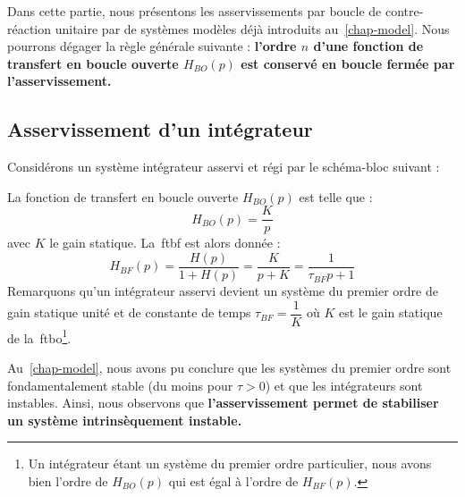 Dans cette partie, nous présentons les asservissements par boucle 
de contre-réaction unitaire par de systèmes modèles déjà introduits 
au~\cref{chap-model}. Nous pourrons dégager la règle générale suivante :
\textbf{l'ordre $n$ d'une fonction de transfert en boucle ouverte $H_{BO}(p)$
est conservé en boucle fermée par l'asservissement.}

\subsection{Asservissement d'un intégrateur}

Considérons un système intégrateur asservi et régi par le schéma-bloc suivant :
\begin{center}
\end{center}

La fonction de transfert en boucle ouverte $H_{BO}(p)$ est telle que :
$$
H_{BO}(p)=\dfrac{K}{p}
$$
avec $K$ le gain statique. 
La~\gls{ftbf} est alors donnée :
$$
H_{BF}(p)=\dfrac{H(p)}{1+H(p)}=\dfrac{K}{p+K}=\dfrac{1}{\tau_{BF} p+1}
$$
Remarquons qu'un intégrateur asservi devient un système du premier 
ordre de gain statique unité et de constante de temps $\tau_{BF}=\dfrac{1}{K}$ 
où $K$ est le gain statique de la~\gls{ftbo}\footnote{Un intégrateur étant 
un système du premier ordre particulier, nous avons bien l'ordre de $H_{BO}(p)$ qui est égal à l'ordre de $H_{BF}(p)$.}. 

Au~\cref{chap-model}, nous avons pu conclure que les systèmes du premier ordre 
sont fondamentalement stable (du moins pour $\tau>0$) et que les intégrateurs sont 
instables.
Ainsi, nous observons que \textbf{l'asservissement permet de stabiliser un système 
intrinsèquement instable.} 

